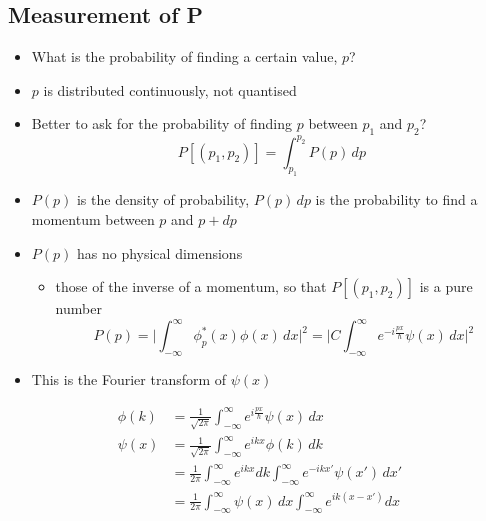 \documentclass[a4paper,11pt,normalem]{article}
\begin{document}
\subsection{Measurement of P}\label{measurement-of-p}

\begin{itemize}
\item
  What is the probability of finding a certain value, \(p\)?
\item
  \(p\) is distributed continuously, not quantised
\item
  Better to ask for the probability of finding \(p\) between \(p_1\) and
  \(p_2\)?
\[
    P[(p_1,p_2)] = \int_{p_1}^{p_2} P(p)\,dp
\]
\item
  \(P(p)\) is the density of probability, \(P(p)\,dp\) is the probability
  to find a momentum between \(p\) and \(p+dp\)
\item
  \(P(p)\) has no physical dimensions
  \begin{itemize}
  \item
    those of the inverse of a momentum, so that \(P[(p_1,p_2)]\) is a
    pure number
\[
    P(p) = \Bigg|\int_{-\infty}^{\infty} \phi_p^{* }(x) \phi(x)\,dx\Bigg|^2 = \Bigg|C\int_{-\infty}^{\infty} e^{-i\frac{px}{\hbar}}\psi(x)\,dx\Bigg|^2
\]
  \end{itemize}
\item
  This is the Fourier transform of \(\psi(x)\)
\end{itemize}
\[
    \begin{aligned}
    \phi(k) &= \frac{1}{\sqrt{2\pi}} \int_{-\infty}^{\infty} e^{i\frac{px}{\hbar}}\psi(x)\,dx \\
    \psi(x) &= \frac{1}{\sqrt{2\pi}} \int_{-\infty}^{\infty} e^{ikx}\phi(k)\,dk \\
    &= \frac{1}{2\pi}\int_{-\infty}^{\infty} e^{ikx}dk \int_{-\infty}^{\infty} e^{-ikx'}\psi(x')\,dx' \\
    &= \frac{1}{2\pi}\int_{-\infty}^{\infty} \psi(x)\,dx  \int_{-\infty}^{\infty} e^{ik(x-x')} dx
    \end{aligned}
\]

\section{}\label{lecture-11}
\end{document}
